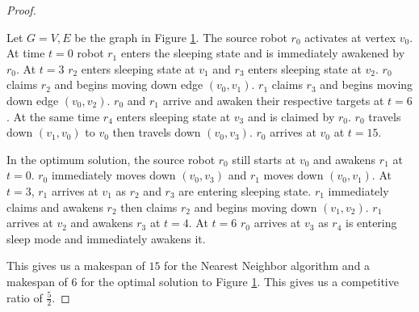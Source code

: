\documentclass[twoside]{article}
\begin{document}
\begin{multicols}{2}
\begin{proof}
\begin{figure}[H]
	\caption{}
	\label{fig:1}
	
\end{figure}

Let $G = {V, E}$ be the graph in Figure \ref{fig:1}. The source robot $r_0$ activates at vertex  $v_0$. At time $t = 0$ robot $r_1$ enters the sleeping state and is immediately awakened by $r_0$. At $t = 3$ $r_2$ enters sleeping state at $v_1$ and $r_3$ enters sleeping state at $v_2$. $r_0$ claims $r_2$ and begins moving down edge $(v_0, v_1)$. $r_1$ claims $r_3$ and begins moving down edge $(v_0, v_2)$. $r_0$ and $r_1$ arrive and awaken their respective targets at $t = 6$. At the same time $r_4$ enters sleeping state at $v_3$ and is claimed by $r_0$. $r_0$ travels down $(v_1, v_0)$ to $v_0$ then travels down $(v_0, v_3)$. $r_0$ arrives at $v_0$ at $t = 15$.

In the optimum solution, the source robot $r_0$ still starts at $v_0$ and awakens $r_1$ at $t = 0$. $r_0$ immediately moves down $(v_0, v_3)$ and $r_1$ moves down $(v_0, v_1)$. At $t = 3$, $r_1$ arrives at $v_1$ as $r_2$ and $r_3$ are entering sleeping state. $r_1$ immediately claims and awakens $r_2$ then claims $r_2$ and begins moving down $(v_1, v_2)$. $r_1$ arrives at $v_2$ and awakens $r_3$ at $t = 4$. At $t = 6$ $r_0$ arrives at $v_3$ as $r_4$ is entering sleep mode and immediately awakens it. 

This gives us a makespan of $15$ for the Nearest Neighbor algorithm and a makespan of 6 for the optimal solution to Figure \ref{fig:1}. This gives us a competitive ratio of  $\frac{5}{2}$.
\end{proof}

\end{multicols}
\end{document}

